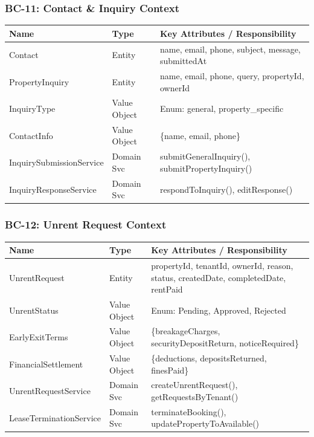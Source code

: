 \documentclass[12pt,a4paper]{article}
\begin{document}
\subsubsection{BC-11: Contact \& Inquiry Context}

\begin{center}
\begin{tabular}{@{}p{3.5cm}p{2cm}p{8.5cm}@{}}
\toprule
\textbf{Name} & \textbf{Type} & \textbf{Key Attributes / Responsibility} \\
\midrule
Contact & Entity & name, email, phone, subject, message, submittedAt \\
PropertyInquiry & Entity & name, email, phone, query, propertyId, ownerId \\
InquiryType & Value Object & Enum: general, property\_specific \\
ContactInfo & Value Object & \{name, email, phone\} \\
InquirySubmissionService & Domain Svc & submitGeneralInquiry(), submitPropertyInquiry() \\
InquiryResponseService & Domain Svc & respondToInquiry(), editResponse() \\
\bottomrule
\end{tabular}
\end{center}

\subsubsection{BC-12: Unrent Request Context}

\begin{center}
\begin{tabular}{@{}p{3.5cm}p{2cm}p{8.5cm}@{}}
\toprule
\textbf{Name} & \textbf{Type} & \textbf{Key Attributes / Responsibility} \\
\midrule
UnrentRequest & Entity & propertyId, tenantId, ownerId, reason, status, createdDate, completedDate, rentPaid \\
UnrentStatus & Value Object & Enum: Pending, Approved, Rejected \\
EarlyExitTerms & Value Object & \{breakageCharges, securityDepositReturn, noticeRequired\} \\
FinancialSettlement & Value Object & \{deductions, depositsReturned, finesPaid\} \\
UnrentRequestService & Domain Svc & createUnrentRequest(), getRequestsByTenant() \\
LeaseTerminationService & Domain Svc & terminateBooking(), updatePropertyToAvailable() \\
\bottomrule
\end{tabular}
\end{center}
\end{document}
